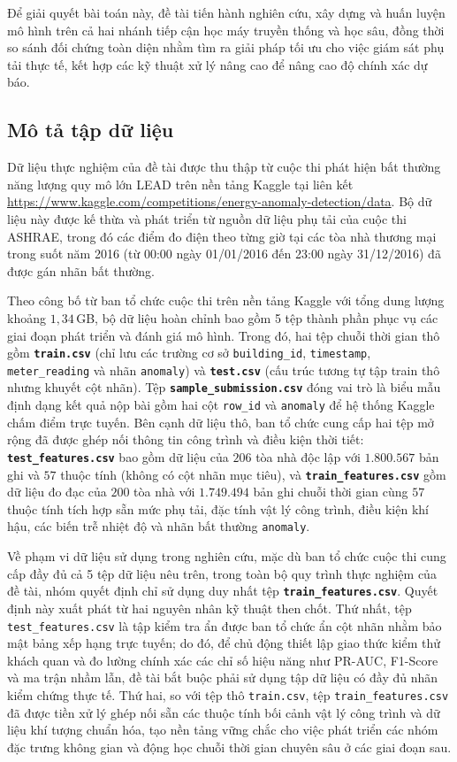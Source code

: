 Để giải quyết bài toán này, đề tài tiến hành nghiên cứu, xây dựng và huấn luyện mô hình trên cả hai nhánh tiếp cận học máy truyền thống và học sâu, đồng thời so sánh đối chứng toàn diện nhằm tìm ra giải pháp tối ưu cho việc giám sát phụ tải thực tế, kết hợp các kỹ thuật xử lý nâng cao để nâng cao độ chính xác dự báo.

\subsection{Mô tả tập dữ liệu}

Dữ liệu thực nghiệm của đề tài được thu thập từ cuộc thi phát hiện bất thường năng lượng quy mô lớn LEAD trên nền tảng Kaggle tại liên kết \url{https://www.kaggle.com/competitions/energy-anomaly-detection/data}. Bộ dữ liệu này được kế thừa và phát triển từ nguồn dữ liệu phụ tải của cuộc thi ASHRAE, trong đó các điểm đo điện theo từng giờ tại các tòa nhà thương mại trong suốt năm 2016 (từ 00:00 ngày 01/01/2016 đến 23:00 ngày 31/12/2016) đã được gán nhãn bất thường.

Theo công bố từ ban tổ chức cuộc thi trên nền tảng Kaggle với tổng dung lượng khoảng $1{,}34$\,GB, bộ dữ liệu hoàn chỉnh bao gồm 5 tệp thành phần phục vụ các giai đoạn phát triển và đánh giá mô hình. Trong đó, hai tệp chuỗi thời gian thô gồm \textbf{\texttt{train.csv}} (chỉ lưu các trường cơ sở \texttt{building\_id}, \texttt{timestamp}, \texttt{meter\_reading} và nhãn \texttt{anomaly}) và \textbf{\texttt{test.csv}} (cấu trúc tương tự tập train thô nhưng khuyết cột nhãn). Tệp \textbf{\texttt{sample\_submission.csv}} đóng vai trò là biểu mẫu định dạng kết quả nộp bài gồm hai cột \texttt{row\_id} và \texttt{anomaly} để hệ thống Kaggle chấm điểm trực tuyến. Bên cạnh dữ liệu thô, ban tổ chức cung cấp hai tệp mở rộng đã được ghép nối thông tin công trình và điều kiện thời tiết: \textbf{\texttt{test\_features.csv}} bao gồm dữ liệu của $206$ tòa nhà độc lập với $1{.}800{.}567$ bản ghi và $57$ thuộc tính (không có cột nhãn mục tiêu), và \textbf{\texttt{train\_features.csv}} gồm dữ liệu đo đạc của $200$ tòa nhà với $1{.}749{.}494$ bản ghi chuỗi thời gian cùng $57$ thuộc tính tích hợp sẵn mức phụ tải, đặc tính vật lý công trình, điều kiện khí hậu, các biến trễ nhiệt độ và nhãn bất thường \texttt{anomaly}.

Về phạm vi dữ liệu sử dụng trong nghiên cứu, mặc dù ban tổ chức cuộc thi cung cấp đầy đủ cả 5 tệp dữ liệu nêu trên, trong toàn bộ quy trình thực nghiệm của đề tài, nhóm quyết định chỉ sử dụng duy nhất tệp \textbf{\texttt{train\_features.csv}}. Quyết định này xuất phát từ hai nguyên nhân kỹ thuật then chốt. Thứ nhất, tệp \texttt{test\_features.csv} là tập kiểm tra ẩn được ban tổ chức ẩn cột nhãn nhằm bảo mật bảng xếp hạng trực tuyến; do đó, để chủ động thiết lập giao thức kiểm thử khách quan và đo lường chính xác các chỉ số hiệu năng như PR-AUC, F1-Score và ma trận nhầm lẫn, đề tài bắt buộc phải sử dụng tập dữ liệu có đầy đủ nhãn kiểm chứng thực tế. Thứ hai, so với tệp thô \texttt{train.csv}, tệp \texttt{train\_features.csv} đã được tiền xử lý ghép nối sẵn các thuộc tính bối cảnh vật lý công trình và dữ liệu khí tượng chuẩn hóa, tạo nền tảng vững chắc cho việc phát triển các nhóm đặc trưng không gian và động học chuỗi thời gian chuyên sâu ở các giai đoạn sau.

